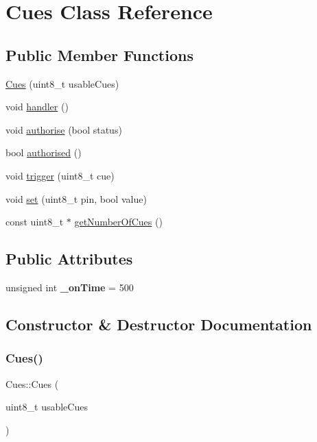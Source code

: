 \hypertarget{class_cues}{}\section{Cues Class Reference}
\label{class_cues}
\subsection*{Public Member Functions}
\begin{DoxyCompactItemize}
\item 
\hyperlink{class_cues_a9f01bb8216550aa7c3a5e424fa6236fa}{Cues} (uint8\+\_\+t usable\+Cues)
\item 
void \hyperlink{class_cues_afeafbb13d2cf0190867dfc719c954b0a}{handler} ()
\item 
void \hyperlink{class_cues_ac16c59fc0bf1d78551702aae1c6890ed}{authorise} (bool status)
\item 
bool \hyperlink{class_cues_a2d6a154816bb8c21300ef28cbecf70bf}{authorised} ()
\item 
void \hyperlink{class_cues_abc065af1058efc265ac3ffdf795b5e90}{trigger} (uint8\+\_\+t cue)
\item 
void \hyperlink{class_cues_a6885f81fba1f48a3c3364c6e42b2a169}{set} (uint8\+\_\+t pin, bool value)
\item 
const uint8\+\_\+t $\ast$ \hyperlink{class_cues_aec66f445c05bb8888fe03a9e63a5326b}{get\+Number\+Of\+Cues} ()
\end{DoxyCompactItemize}
\subsection*{Public Attributes}
\begin{DoxyCompactItemize}
\item 
\mbox{\label{class_cues_ad7be16a310e6778f5e71adb8d1adc4ae}} 
unsigned int {\bfseries \+\_\+on\+Time} = 500
\end{DoxyCompactItemize}


\subsection{Constructor \& Destructor Documentation}
\mbox{\label{class_cues_a9f01bb8216550aa7c3a5e424fa6236fa}} 
\subsubsection{\texorpdfstring{Cues()}{Cues()}}
{\footnotesize\ttfamily Cues\+::\+Cues (\begin{DoxyParamCaption}\item[{uint8\+\_\+t}]{usable\+Cues }\end{DoxyParamCaption})}

